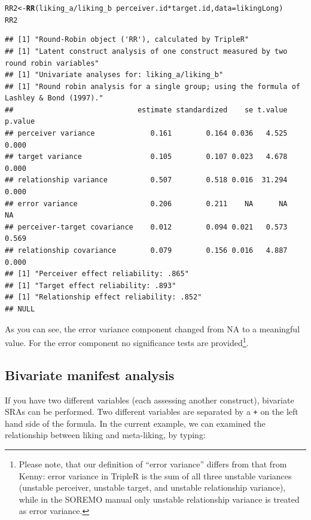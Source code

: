\documentclass[a4paper]{article}\usepackage[]{graphicx}\usepackage[]{color}
\makeatletter
\newcommand{\hlopt}[1]{\textcolor[rgb]{0,0,0}{#1}}%
\newcommand{\hlstd}[1]{\textcolor[rgb]{0.345,0.345,0.345}{#1}}%
\newcommand{\hlkwb}[1]{\textcolor[rgb]{0.69,0.353,0.396}{#1}}%
\newcommand{\hlkwc}[1]{\textcolor[rgb]{0.333,0.667,0.333}{#1}}%
\newcommand{\hlkwd}[1]{\textcolor[rgb]{0.737,0.353,0.396}{\textbf{#1}}}%
\newenvironment{kframe}{%
 \def\at@end@of@kframe{}%
 \ifinner\ifhmode%
  \def\at@end@of@kframe{\end{minipage}}%
  \begin{minipage}{\columnwidth}%
 \fi\fi%
 \def\FrameCommand##1{\hskip\@totalleftmargin \hskip-\fboxsep
 \colorbox{shadecolor}{##1}\hskip-\fboxsep
     \hskip-\linewidth \hskip-\@totalleftmargin \hskip\columnwidth}%
 \MakeFramed {\advance\hsize-\width
   \@totalleftmargin\z@ \linewidth\hsize
   \@setminipage}}%
 {\par\unskip\endMakeFramed%
 \at@end@of@kframe}
\newenvironment{knitrout}{}{} %
\makeatother
\begin{document}
\begin{knitrout}\small
{}\color{fgcolor}\begin{kframe}
\begin{alltt}
\hlstd{RR2} \hlkwb{<-} \hlkwd{RR}\hlstd{(liking_a}\hlopt{/}\hlstd{liking_b} \hlopt{~} \hlstd{perceiver.id} \hlopt{*} \hlstd{target.id,} \hlkwc{data} \hlstd{= likingLong)}
\hlstd{RR2}
\end{alltt}
\begin{verbatim}
## [1] "Round-Robin object ('RR'), calculated by TripleR"
## [1] "Latent construct analysis of one construct measured by two round robin variables"
## [1] "Univariate analyses for: liking_a/liking_b"
## [1] "Round robin analysis for a single group; using the formula of Lashley & Bond (1997)."
##                             estimate standardized    se t.value p.value
## perceiver variance             0.161        0.164 0.036   4.525   0.000
## target variance                0.105        0.107 0.023   4.678   0.000
## relationship variance          0.507        0.518 0.016  31.294   0.000
## error variance                 0.206        0.211    NA      NA      NA
## perceiver-target covariance    0.012        0.094 0.021   0.573   0.569
## relationship covariance        0.079        0.156 0.016   4.887   0.000
## [1] "Perceiver effect reliability: .865"
## [1] "Target effect reliability: .893"
## [1] "Relationship effect reliability: .852"
## NULL
\end{verbatim}
\end{kframe}
\end{knitrout}

As you can see, the error variance component changed from NA to a meaningful value. For the error component no significance tests are provided\footnote{Please note, that our definition of ``error variance'' differs from that from Kenny: error variance in TripleR is the sum of all three unstable variances (unstable perceiver, unstable target, and unstable relationship variance), while in the SOREMO manual only unstable relationship variance is treated as error variance.}.




\subsection{Bivariate manifest analysis} %
\label{sub:bivariate_manifest_analysis}
If you have two different variables (each assessing another construct), bivariate SRAs can be performed. Two different variables are separated by a \texttt{+} on the left hand side of the formula. In the current example, we can examined the relationship between liking and meta-liking, by typing:
\end{document}

